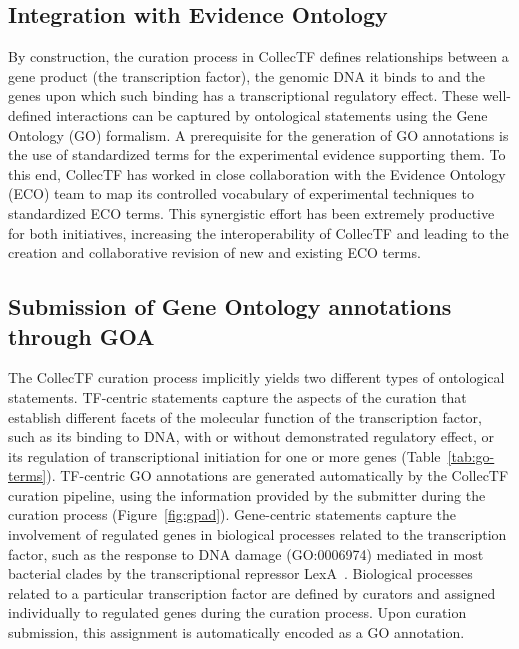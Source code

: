 \subsection{Integration with Evidence Ontology}

By construction, the curation process in CollecTF defines relationships between
a gene product (the transcription factor), the genomic DNA it binds to and the
genes upon which such binding has a transcriptional regulatory effect. These
well-defined interactions can be captured by ontological statements using the
Gene Ontology (GO) formalism. A prerequisite for the generation of GO
annotations is the use of standardized terms for the experimental evidence
supporting them. To this end, CollecTF has worked in close collaboration with
the Evidence Ontology (ECO) team to map its controlled vocabulary of
experimental techniques to standardized ECO terms. This synergistic effort has
been extremely productive for both initiatives, increasing the interoperability
of CollecTF and leading to the creation and collaborative revision of new and
existing ECO terms.

\subsection{Submission of Gene Ontology annotations through GOA}
The CollecTF curation process implicitly yields two different types of
ontological statements. TF-centric statements capture the aspects of the
curation that establish different facets of the molecular function of the
transcription factor, such as its binding to DNA, with or without demonstrated
regulatory effect, or its regulation of transcriptional initiation for one or
more genes (Table~\ref{tab:go-terms}). TF-centric GO annotations are generated
automatically by the CollecTF curation pipeline, using the information provided
by the submitter during the curation process
(Figure~\ref{fig:gpad}). Gene-centric statements capture the involvement of
regulated genes in biological processes related to the transcription factor,
such as the response to DNA damage (GO:0006974) mediated in most bacterial
clades by the transcriptional repressor LexA~\cite{erill2007aeons}. Biological
processes related to a particular transcription factor are defined by curators
and assigned individually to regulated genes during the curation process. Upon
curation submission, this assignment is automatically encoded as a GO
annotation.


